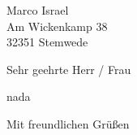\documentclass[
    version=last,           %
    DIV=13,                 %
    BCOR=0mm,               %
    paper=a4,               %
    fontsize=12pt,          %
    firsthead=on,           %
    firstfoot=on,           %
    pagenumber=on,i         %
    parskip=half,           %
    enlargefirstpage=,      %
    firsthead=on,           %
    fromrule=afteraddress,  %
    priority=off,           %
    backaddress=true,       %
    refline=dateright,      %
	fromalign=right,	    %
    fromemail=on,i          %
    fromurl=on,             %
    frombank=on,
    fromphone=on,           %
    frommobilephone=on      %
    fromlogo=on,            %
    addrfield=on,           %
    subject=untitled,  %
    foldmarks=off,          %
    numericaldate=off,      %
	pagenumber=right,	        %
	parskip=half,	        %
    headsep=false,          %
    footsepline=true,       %
    foldmarks=off,		    %
	]{scrlttr2}
\begin{document}

\begin{letter}{Marco Israel \\ Am Wickenkamp 38  \\ 32351 Stemwede}



\opening{Sehr geehrte Herr / Frau}
nada
\closing{Mit freundlichen Grüßen}

\end{letter}
\end{document}
